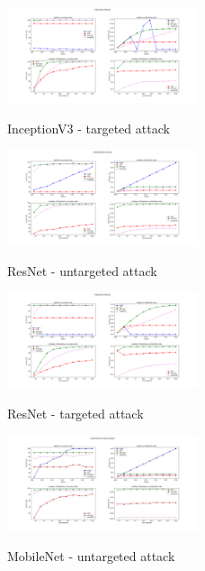 \documentclass[10pt,twocolumn,letterpaper, english]{article}
\theoremstyle{definition}
\theoremstyle{plain}
\theoremstyle{plain}
\theoremstyle{plain}
\theoremstyle{plain}
\theoremstyle{remark}
\theoremstyle{remark}
\theoremstyle{definition}
\theoremstyle{definition}
\theoremstyle{definition}
\theoremstyle{definition}
\begin{document}
\begin{figure}[H]
  \centering
  \includegraphics[width=0.5\textwidth]{report_template/Images/InceptionV3-targeted_grid.pdf}\\
  \caption{InceptionV3 - targeted attack } \label{incV3-t}
\end{figure}

\begin{figure}[H]
  \centering
  \includegraphics[width=0.5\textwidth]{report_template/Images/ResNet-untargeted_grid.pdf}\\
  \caption{ResNet - untargeted attack } \label{res-unt}
\end{figure}

\begin{figure}[H]
  \centering
  \includegraphics[width=0.5\textwidth]{report_template/Images/ResNet-targeted_grid.pdf}\\
  \caption{ResNet - targeted attack } \label{res-t}
\end{figure}

\begin{figure}[H]
  \centering
  \includegraphics[width=0.5\textwidth]{report_template/Images/MobileNet-Untargeted.jpeg}\\
  \caption{MobileNet - untargeted attack } \label{mob-unt}
\end{figure}
\end{document}
